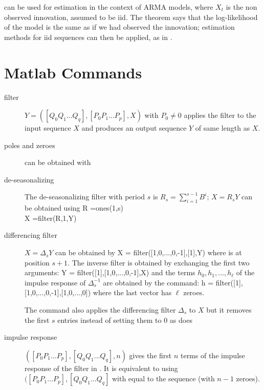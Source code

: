  can be used for
estimation in the context of ARMA models, where
$X_t$ is the non observed innovation, assumed to
be iid. The theorem says that the log-likelihood
of the model is the same as if we had observed
the innovation; estimation methods for iid
sequences can then be applied, as in
.





\section{Matlab Commands} \label{sec-cs-matlab}
\begin{description}
\item[filter]
%
$Y=$$([Q_0 Q_1 \hdots Q_q], [P_0 P_1
\hdots P_p], X)$ with $P_0 \neq 0$ applies the filter
   \be{}
\label{eq-fil-ex}
   \ee
to the input sequence $X$ and produces an output
sequence $Y$ of same length as $X$.
%
\item[poles and zeroes] can be obtained with 
%
\item[de-seasonalizing] The de-seasonalizing filter
with period $s$ is $R_s=\sum_{i=1}^{s-1}B^i$; $X=R_sY$
can be obtained using \bp
 R \>=\>ones(1,s)\\
X \>=\>filter(R,1,Y) \ep
%
\item[differencing filter] $X=\Delta_s Y$ can be obtained  by
 \bp
 X = filter([1,0,...,0,-1],[1],Y)
 \ep
 where  is at position $s+1$.
The inverse filter is obtained by exchanging the
 first two arguments:
 \bp
 Y = filter([1],[1,0,...,0,-1],X)
 \ep
and the terms $h_0,h_1, ...,h_{\ell}$ of the impulse
response of $\Delta_s^{-1}$ are obtained by the
command: \bp
 h = filter([1],[1,0,...,0,-1],[1,0,...,0])
 \ep
where the last vector has $\ell$ zeroes.

The command  also applies the
differencing filter $\Delta_s$ to $X$ but it removes
the first $s$ entries instead of setting them to $0$
as  does

\item[impulse response]
$([P_0 P_1 \hdots P_p], [Q_0 Q_1 \hdots
Q_q],n)$ gives the first $n$ terms of the impulse
response of the filter in . It is
equivalent to using $([P_0 P_1 \hdots
P_p], [Q_0 Q_1 \hdots Q_q]$ with
 equal to the sequence \pro{[1 0 ... 0]}
(with $n-1$ zeroes).


\end{description}
